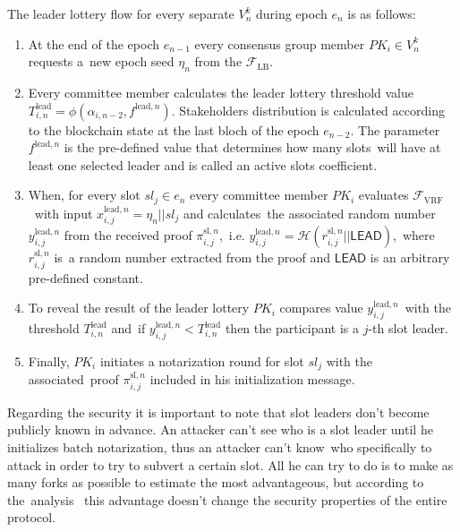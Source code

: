The leader lottery flow for every separate $V_n^k$ during epoch $e_n$ is as follows:
\begin{enumerate}
    \item At the end of the epoch $e_{n-1}$ every consensus group member $PK_i \in V_n^k$ requests a\
    new epoch seed $\eta_n$ from the ${\mathcal{F}}_{\text{LB}}$.
    \item Every committee member calculates the leader lottery threshold value\
    $T_{i, n}^{\text{lead}} = \phi(\alpha_{i, {n - 2}}, f^{\text{lead}, n})$.
    Stakeholders distribution is calculated according to the blockchain state at the last bloch of the epoch $e_{n - 2}$.
    The parameter $f^{\text{lead}, n}$ is the pre-defined value that determines how many slots\
    will have at least one selected leader and is called an active slots coefficient.
    \item When, for every slot $sl_j \in e_n$ every committee member $PK_i$ evaluates ${\mathcal{F}}_{\text{VRF}}$\
    with input $x_{i, j}^{\text{lead}, n} = \eta_n || sl_j $ and calculates\
    the associated random number $y_{i, j}^{\text{lead}, n}$ from the received proof $\pi_{i, j}^{\text{sl}, n}$,\
    i.e. ${y_{i, j}^{\text{lead}, n} = \mathcal{H}(r_{i, j}^{\text{sl}, n}||\textsf{LEAD})}$,\
    where $r_{i, j}^{\text{sl}, n}$ is\
    a random number extracted from the proof and $\textsf{LEAD}$ is an arbitrary pre-defined constant.
    \item To reveal the result of the leader lottery $PK_i$ compares value $y_{i, j}^{\text{lead}, n}$\
    with the threshold $T_{i, n}^{\text{lead}}$ and\
    if ${y_{i, j}^{\text{lead}, n} < T_{i, n}^{\text{lead}}}$ then the participant is a $j$-th slot leader.\
    \item Finally, $PK_i$ initiates a notarization round for slot $sl_j$ with the associated\
    proof $\pi_{i, j}^{\text{sl}, n}$ included in his initialization message.
\end{enumerate}

Regarding the security it is important to note that slot leaders don't become publicly known in advance.
An attacker can't see who is a slot leader until he initializes batch notarization, thus an attacker can't know\
who specifically to attack in order to try to subvert a certain slot.
All he can try to do is to make as many forks as possible to estimate the most advantageous, but according to the\
analysis~\cite{cryptoeprint:2017/573} this advantage doesn't change the security properties of the entire protocol.

